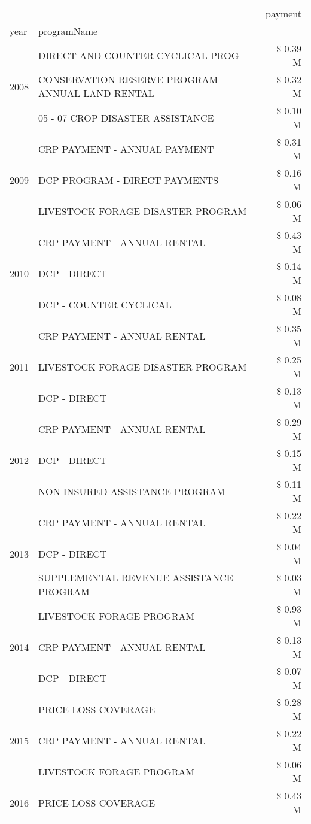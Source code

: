 \begin{tabular}{llr}
\toprule
 &  & payment \\
year & programName &  \\
\midrule
\multirow[t]{3}{*}{2008} & DIRECT AND COUNTER CYCLICAL PROG & \$ 0.39 M \\
 & CONSERVATION RESERVE PROGRAM - ANNUAL LAND RENTAL & \$ 0.32 M \\
 & 05 - 07 CROP DISASTER ASSISTANCE & \$ 0.10 M \\
\cline{1-3}
\multirow[t]{3}{*}{2009} & CRP PAYMENT - ANNUAL PAYMENT & \$ 0.31 M \\
 & DCP PROGRAM - DIRECT PAYMENTS & \$ 0.16 M \\
 & LIVESTOCK FORAGE DISASTER  PROGRAM & \$ 0.06 M \\
\cline{1-3}
\multirow[t]{3}{*}{2010} & CRP PAYMENT - ANNUAL RENTAL & \$ 0.43 M \\
 & DCP - DIRECT & \$ 0.14 M \\
 & DCP - COUNTER CYCLICAL & \$ 0.08 M \\
\cline{1-3}
\multirow[t]{3}{*}{2011} & CRP PAYMENT - ANNUAL RENTAL & \$ 0.35 M \\
 & LIVESTOCK FORAGE DISASTER PROGRAM & \$ 0.25 M \\
 & DCP - DIRECT & \$ 0.13 M \\
\cline{1-3}
\multirow[t]{3}{*}{2012} & CRP PAYMENT - ANNUAL RENTAL & \$ 0.29 M \\
 & DCP - DIRECT & \$ 0.15 M \\
 & NON-INSURED ASSISTANCE PROGRAM & \$ 0.11 M \\
\cline{1-3}
\multirow[t]{3}{*}{2013} & CRP PAYMENT - ANNUAL RENTAL & \$ 0.22 M \\
 & DCP - DIRECT & \$ 0.04 M \\
 & SUPPLEMENTAL REVENUE ASSISTANCE PROGRAM & \$ 0.03 M \\
\cline{1-3}
\multirow[t]{3}{*}{2014} & LIVESTOCK FORAGE PROGRAM & \$ 0.93 M \\
 & CRP PAYMENT - ANNUAL RENTAL & \$ 0.13 M \\
 & DCP - DIRECT & \$ 0.07 M \\
\cline{1-3}
\multirow[t]{3}{*}{2015} & PRICE LOSS COVERAGE & \$ 0.28 M \\
 & CRP PAYMENT - ANNUAL RENTAL & \$ 0.22 M \\
 & LIVESTOCK FORAGE PROGRAM & \$ 0.06 M \\
\cline{1-3}
\multirow[t]{3}{*}{2016} & PRICE LOSS COVERAGE & \$ 0.43 M \\

\end{tabular}
